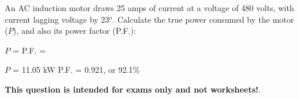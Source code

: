 

An AC induction motor draws 25 amps of current at a voltage of 480 volts, with current lagging voltage by 23$^{o}$.  Calculate the true power consumed by the motor ($P$), and also its power factor (P.F.):

\vskip 10pt

$P$ = \hskip 150pt P.F. = 







$P$ = 11.05 kW \hskip 100pt P.F. = 0.921, or 92.1\%







{\bf This question is intended for exams only and not worksheets!}.



